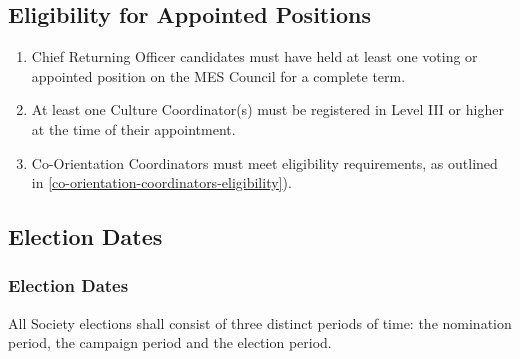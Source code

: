 \subsection{Eligibility for Appointed Positions}
\label{eligibility-for-appointed-positions}

\begin{enumerate}
 \item
  Chief Returning Officer candidates must have held at least one voting or appointed position on the MES Council for a complete term.
 \item
  At least one Culture Coordinator(s) must be registered in Level III or higher at the time of their appointment.
 \item
  Co-Orientation Coordinators must meet eligibility requirements, as outlined in \ref{co-orientation-coordinators-eligibility}).
\end{enumerate}

\subsection{Election Dates}
\label{election-dates}

\subsubsection{Election Dates}
\label{election-dates-1}
All Society elections shall consist of three distinct periods of time:
the nomination period, the campaign period and the election period.

